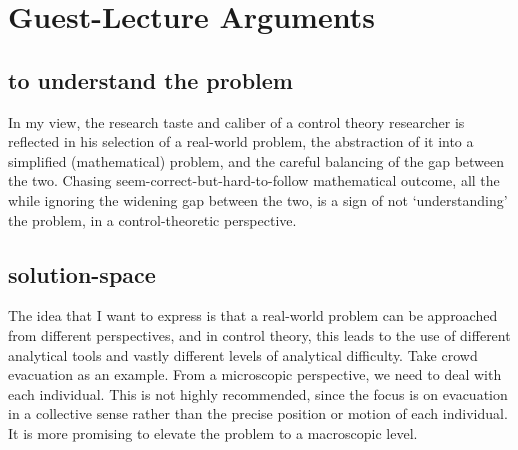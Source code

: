 \documentclass[11pt]{article}
\begin{document}
\section{Guest-Lecture Arguments}
\subsection{to understand the problem}
In my view, the research taste and caliber of a control theory researcher is reflected in his selection of a real-world problem, the abstraction of it into a simplified (mathematical) problem, and the careful balancing of the gap between the two. Chasing seem-correct-but-hard-to-follow mathematical outcome, all the while ignoring the widening gap between the two, is a sign of not `understanding' the problem, in a control-theoretic perspective. 

\subsection{solution-space}
The idea that I want to express is that a real-world problem can be approached from different perspectives, and in control theory, this leads to the use of different analytical tools and vastly different levels of analytical difficulty. Take crowd evacuation as an example. From a microscopic perspective, we need to deal with each individual. This is not highly recommended, since the focus is on evacuation in a collective sense rather than the precise position or motion of each individual. It is more promising to elevate the problem to a macroscopic level. 
\end{document}
